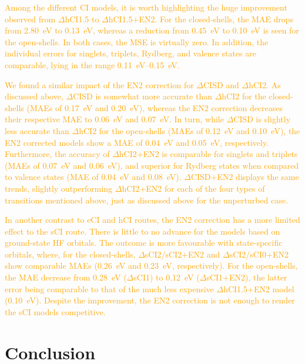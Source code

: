 \documentclass[aip,jcp,reprint,noshowkeys,superscriptaddress]{revtex4-1}
\newcommand{\fk}[1]{\textcolor{orange}{#1}}
\begin{document}
\fk{
Among the different CI models, it is worth highlighting the huge improvement observed from $\Delta$hCI1.5 to $\Delta$hCI1.5+EN2.
For the closed-shells, the MAE drops from \SI{2.80}{\eV} to \SI{0.13}{\eV}, whereas a reduction from \SI{0.45}{\eV} to \SI{0.10}{\eV} is seen for the open-shells.
In both cases, the MSE is virtually zero.
In addition, the individual errors for singlets, triplets, Rydberg, and valence states are comparable, lying in the range \SIrange{0.11}{0.15}{\eV}.
}

\fk{
We found a similar impact of the EN2 correction for $\Delta$CISD and $\Delta$hCI2.
As discussed above, $\Delta$CISD is somewhat more accurate than $\Delta$hCI2 for the closed-shells (MAEs of \SI{0.17}{\eV} and \SI{0.20}{\eV}),
whereas the EN2 correction decreases their respective MAE to \SI{0.06}{\eV} and \SI{0.07}{\eV}.
In turn, while $\Delta$CISD is slightly less accurate than $\Delta$hCI2 for the open-shells (MAEs of \SI{0.12}{\eV} and \SI{0.10}{\eV}),
the EN2 corrected models show a MAE of \SI{0.04}{\eV} and \SI{0.05}{\eV}, respectively.
Furthermore, the accuracy of $\Delta$hCI2+EN2 is comparable for singlets and triplets (MAEs of \SI{0.07}{\eV} and \SI{0.06}{\eV}),
and superior for Rydberg states when compared to valence states (MAE of \SI{0.04}{\eV} and \SI{0.08}{\eV}).
$\Delta$CISD+EN2 displays the same trends, slightly outperforming $\Delta$hCI2+EN2 for each of the four types of transitions mentioned above, just as discussed above for the unperturbed case.
}

\fk{
In another contrast to eCI and hCI routes, the EN2 correction has a more limited effect to the sCI route.
There is little to no advance for the models based on ground-state HF orbitals.
The outcome is more favourable with state-specific orbitals,
where, for the closed-shells, $\Delta$sCI2/sCI2+EN2 and $\Delta$sCI2/sCI0+EN2 show comparable MAEs (\SI{0.26}{\eV} and \SI{0.23}{\eV}, respectively).
For the open-shells, the MAE decrease from \SI{0.28}{\eV} ($\Delta$sCI1) to \SI{0.12}{\eV} ($\Delta$sCI1+EN2),
the latter error being comparable to that of the much less expensive $\Delta$hCI1.5+EN2 model (\SI{0.10}{\eV}).
Despite the improvement, the EN2 correction is not enough to render the sCI models competitive.
}

\section{Conclusion}
\label{sec:conclusion}
\end{document}
